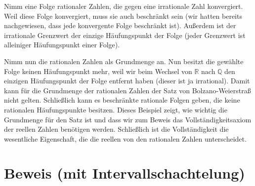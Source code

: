 \documentclass[fontsize=9pt,
               parskip=half-,
               DIV=14,
               listof=chapterentry,
               tocflat]{scrbook}
\begin{document}
Nimm eine Folge rationaler Zahlen, die gegen eine irrationale Zahl konvergiert. Weil diese Folge konvergiert, muss sie auch beschränkt sein (wir hatten bereits nachgewiesen, dass jede konvergente Folge beschränkt ist). Außerdem ist der irrationale Grenzwert der einzige Häufungspunkt der Folge (jeder Grenzwert ist alleiniger Häufungspunkt einer Folge).

Nimm nun die rationalen Zahlen als Grundmenge an. Nun besitzt die gewählte Folge keinen Häufungspunkt mehr, weil wir beim Wechsel von $\mathbb {R} $ nach $\mathbb {Q} $ den einzigen Häufungspunkt der Folge entfernt haben (dieser ist ja irrational). Damit kann für die Grundmenge der rationalen Zahlen der Satz von Bolzano-Weierstraß nicht gelten. Schließlich kann es beschränkte rationale Folgen geben, die keine rationalen Häufungspunkte besitzen. Dieses Beispiel zeigt, wie wichtig die Grundmenge für den Satz ist und dass wir zum Beweis das Vollständigkeitsaxiom der reellen Zahlen benötigen werden. Schließlich ist die Vollständigkeit die wesentliche Eigenschaft, die die reellen von den rationalen Zahlen unterscheidet.

\section{Beweis (mit Intervallschachtelung)}
\end{document}
